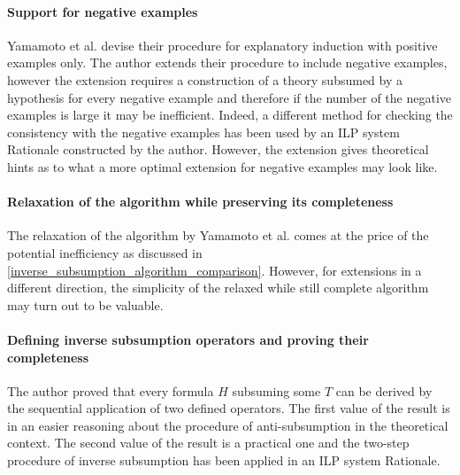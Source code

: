 \paragraph{Support for negative examples}
Yamamoto et al. devise their procedure for explanatory induction with positive examples only. The author extends their procedure to include negative examples, however the extension requires a construction of a theory subsumed by a hypothesis for every negative example and therefore if the number of the negative examples is large it may be inefficient. Indeed, a different method for checking the consistency with the negative examples has been used by an ILP system Rationale constructed by the author. However, the extension gives theoretical hints as to what a more optimal extension for negative examples may look like.

\paragraph{Relaxation of the algorithm while preserving its completeness}
The relaxation of the algorithm by Yamamoto et al. comes at the price of the potential inefficiency as discussed in \ref{inverse_subsumption_algorithm_comparison}. However, for extensions in a different direction, the simplicity of the relaxed while still complete algorithm may turn out to be valuable.

\paragraph{Defining inverse subsumption operators and proving their completeness}
The author proved that every formula $H$ subsuming some $T$ can be derived by the sequential application of two defined operators. The first value of the result is in an easier reasoning about the procedure of anti-subsumption in the theoretical context. The second value of the result is a practical one and the two-step procedure of inverse subsumption has been applied in an ILP system Rationale.